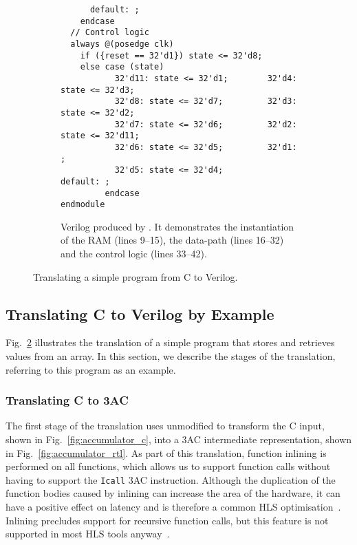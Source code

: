 \begin{figure}
\begin{subfigure}[b]{0.65\linewidth}
\begin{verbatim}
      default: ;
    endcase
  // Control logic
  always @(posedge clk)
    if ({reset == 32'd1}) state <= 32'd8;
    else case (state)
           32'd11: state <= 32'd1;        32'd4: state <= 32'd3;
           32'd8: state <= 32'd7;         32'd3: state <= 32'd2;
           32'd7: state <= 32'd6;         32'd2: state <= 32'd11;
           32'd6: state <= 32'd5;         32'd1: ;
           32'd5: state <= 32'd4;         default: ;
         endcase
endmodule
\end{verbatim}
\caption{Verilog produced by \vericert{}. It demonstrates the instantiation of the RAM (lines 9--15), the data-path (lines 16--32) and the control logic (lines 33--42).}\label{fig:accumulator_v}
\end{subfigure}
\caption{Translating a simple program from C to Verilog.}\label{fig:accumulator_c_rtl}
\end{figure}

\subsection{Translating C to Verilog by Example}
Fig.~\ref{fig:accumulator_c_rtl} illustrates the translation of a simple program that stores and retrieves values from an array.
In this section, we describe the stages of the \vericert{} translation, referring to this program as an example.

\subsubsection{Translating C to 3AC}

The first stage of the translation uses unmodified \compcert{} to transform the C input, shown in Fig.~\ref{fig:accumulator_c}, into a 3AC intermediate representation, shown in Fig.~\ref{fig:accumulator_rtl}.
As part of this translation, function inlining is performed on all functions, which allows us to support function calls without having to support the \texttt{Icall} 3AC instruction.  Although the duplication of the function bodies caused by inlining can increase the area of the hardware, it can have a positive effect on latency and is therefore a common HLS optimisation~\cite{noronha17_rapid_fpga}. Inlining precludes support for recursive function calls, but this feature is not supported in most HLS tools anyway~\cite{davidthomas_asap16}.

